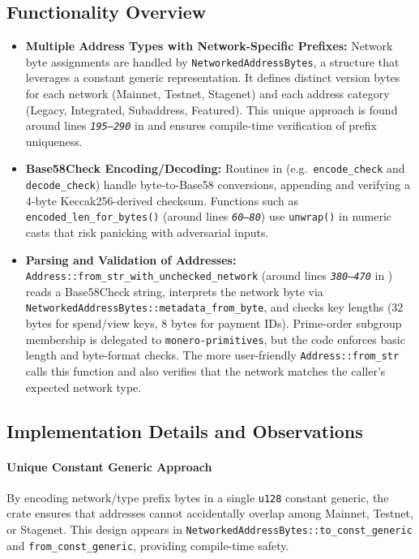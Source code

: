 \documentclass[12pt,a4paper]{article}
\begin{document}
\subsection{Functionality Overview}
\begin{itemize}
    \item \textbf{Multiple Address Types with Network-Specific Prefixes:}  
    Network byte assignments are handled by \texttt{NetworkedAddressBytes}, a structure that leverages a constant generic representation. It defines distinct version bytes for each network (Mainnet, Testnet, Stagenet) and each address category (Legacy, Integrated, Subaddress, Featured). This unique approach is found around lines \textit{\texttt{195--290}} in  and ensures compile-time verification of prefix uniqueness.
    \item \textbf{Base58Check Encoding/Decoding:}  
    Routines in  (e.g.\ \texttt{encode\_check} and \texttt{decode\_check}) handle byte-to-Base58 conversions, appending and verifying a 4-byte Keccak256-derived checksum. Functions such as \texttt{encoded\_len\_for\_bytes()} (around lines \textit{\texttt{60--80}}) use \texttt{unwrap()} in numeric casts that risk panicking with adversarial inputs.
    \item \textbf{Parsing and Validation of Addresses:}  
    \texttt{Address::from\_str\_with\_unchecked\_network} (around lines \textit{\texttt{380--470}} in ) reads a Base58Check string, interprets the network byte via \texttt{NetworkedAddressBytes::metadata\_from\_byte}, and checks key lengths (32 bytes for spend/view keys, 8 bytes for payment IDs). Prime-order subgroup membership is delegated to \texttt{monero-primitives}, but the code enforces basic length and byte-format checks. The more user-friendly \texttt{Address::from\_str} calls this function and also verifies that the network matches the caller’s expected network type.
\end{itemize}

\subsection{Implementation Details and Observations}
\paragraph{Unique Constant Generic Approach}
By encoding network/type prefix bytes in a single \texttt{u128} constant generic, the crate ensures that addresses cannot accidentally overlap among Mainnet, Testnet, or Stagenet. This design appears in \texttt{NetworkedAddressBytes::to\_const\_generic} and \texttt{from\_const\_generic}, providing compile-time safety.
\end{document}
